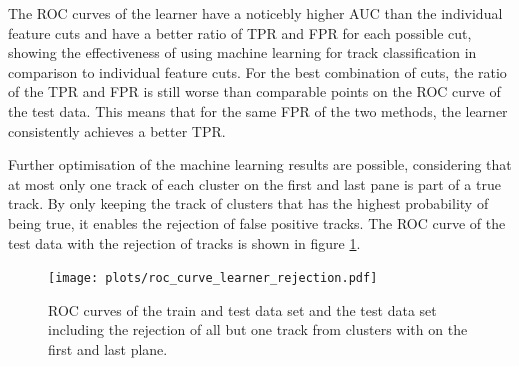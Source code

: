 The ROC curves of the learner have a noticebly higher AUC than the individual feature cuts and have a better ratio of TPR and FPR for each possible cut, showing the effectiveness
of using machine learning for track classification in comparison to individual feature cuts. For the best combination of cuts, the ratio of the TPR and FPR is still worse than
comparable points on the ROC curve of the test data. This means that for the same FPR of the two methods, the learner consistently achieves a better TPR.

Further optimisation of the machine learning results are possible, considering that at most only one track of each cluster
on the first and last pane is part of a true track. By only keeping the track of clusters that has the highest probability of being true, it enables the rejection of
false positive tracks. The ROC curve of the test data with the rejection of tracks is shown in figure \ref{fig:rejection}.


\begin{figure}
  \centering
  \texttt{[image: plots/roc\_curve\_learner\_rejection.pdf]}
  \caption{ROC curves of the train and test data set and the test data set including the rejection of all but one track from clusters with on the first and last plane.}
  \label{fig:rejection}
\end{figure}
